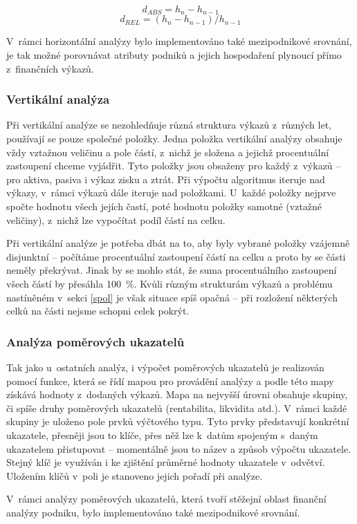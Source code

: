 $$d_{ABS}=h_{n}-h_{n-1}$$
$$d_{REL}=(h_{n}-h_{n-1})/h_{n-1}$$

V~rámci horizontální analýzy bylo implementováno také mezipodnikové srovnání, je tak možné porovnávat atributy podniků a jejich hospodaření plynoucí přímo z~finančních výkazů.


\subsubsection{Vertikální analýza}
Při vertikální analýze se nezohledňuje různá struktura výkazů z~různých let, používají se pouze společné položky. Jedna položka vertikální analýzy obsahuje vždy vztažnou veličinu a pole částí, z~nichž je složena a jejichž procentuální zastoupení chceme vyjádřit. Tyto položky jsou obsaženy pro každý z~výkazů -- pro aktiva, pasiva i výkaz zisku a ztrát. Při výpočtu algoritmus iteruje nad výkazy, v~rámci výkazů dále iteruje nad položkami. U~každé položky nejprve spočte hodnotu všech jejích častí, poté hodnotu položky samotné (vztažné veličiny), z~nichž lze vypočítat podíl částí na celku.

Při vertikální analýze je potřeba dbát na to, aby byly vybrané položky vzájemně disjunktní -- počítáme procentuální zastoupení částí na celku a proto by se části neměly překrývat. Jinak by se mohlo stát, že suma procentuálního zastoupení všech částí by přesáhla 100~\%. Kvůli různým strukturám výkazů a problému nastíněném v~sekci \ref{spol} je však situace spíš opačná -- při rozložení některých celků na části nejsme schopni celek pokrýt.

\subsubsection{Analýza poměrových ukazatelů}
Tak jako u~ostatních analýz, i výpočet poměrových ukazatelů je realizován pomocí funkce, která se řídí mapou pro provádění analýzy a podle této mapy získává hodnoty z~dodaných výkazů. Mapa na nejvyšší úrovni obsahuje skupiny, či spíše druhy poměrových ukazatelů (rentabilita, likvidita atd.). V~rámci každé skupiny je uloženo pole prvků výčtového typu. Tyto prvky představují konkrétní ukazatele, přesněji jsou to klíče, přes něž lze k~datům spojeným s~daným ukazatelem přistupovat -- momentálně jsou to název a způsob výpočtu ukazatele. Stejný klíč je využíván i ke zjištění průměrné hodnoty ukazatele v~odvětví. Uložením klíčů v~poli je stanoveno jejich pořadí při analýze.

V~rámci analýzy poměrových ukazatelů, která tvoří stěžejní oblast finanční analýzy podniku, bylo implementováno také mezipodnikové srovnání.

